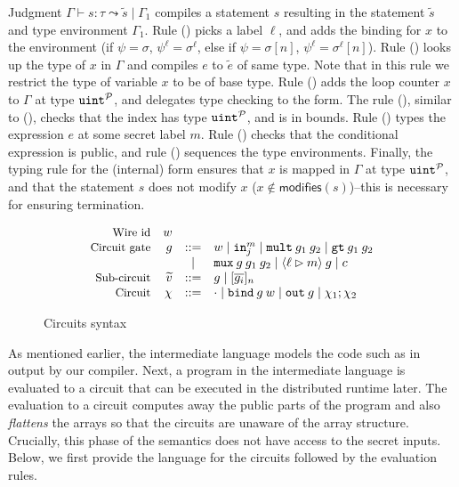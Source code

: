 Judgment $\Gamma \vdash s : \tau \leadsto \widetilde{s} \mid \Gamma_{1}$
compiles a statement $s$ resulting in the statement $\widetilde{s}$
and type environment $\Gamma_{1}$. Rule ({}) picks a label
$\ell$, and adds the binding for $x$ to the environment (if $\psi =
\sigma$, $\psi^\ell = \sigma^\ell$, else if $\psi = \sigma[n]$,
$\psi^\ell = \sigma^\ell[n]$).
Rule ({}) looks up the type of $x$ in $\Gamma$ and compiles $e$ to $\tilde{e}$ of same type.
Note that in this rule we restrict the type of variable $x$ to be of base type.
Rule ({}) adds the loop counter $x$ to $\Gamma$ at type
${\mathtt{uint}}^{\mathcal{P}}$, and delegates type checking to the
 form. The rule ({}), similar to ({}),
checks that the index has type ${\mathtt{uint}}^{\mathcal{P}}$, and is in
bounds. Rule ({})
types the expression $e$ at some secret label $m$. Rule ({})
checks that the conditional expression is public, and rule
({}) sequences the type environments. Finally, the typing
rule for the (internal)  form ensures that $x$ is mapped in
$\Gamma$ at type ${\mathtt{uint}}^{\mathcal{P}}$, and that the statement $s$
does not modify $x$ ($x \notin
\mathsf{modifies}(s)$)--this is necessary for ensuring termination.


\begin{figure}
  \footnotesize
  \[
  \begin{array}{rrcl}
    \text{\small{Wire id}} & w &&\\
    \text{\small{Circuit gate}} & {g} & ::= & w \mid {\ensuremath{\mathtt{in}}}^{m}_{j} \mid {\ensuremath{\mathtt{mult}}}\:{g}_1\:{g}_{2} \mid {\ensuremath{\mathtt{gt}}}\:{g}_{1}\:{g}_{2}\\
    & & \mid & {\mathtt{mux}}\:{g}\:{g}_{1}\:{g}_{2} \mid \langle \ell
    \rhd m \rangle\:{g} \mid c\\
    \text{\small{Sub-circuit}} & \widetilde{v} & ::= & {g} \mid [\overline{{g}_{i}}]_{n}\\
    \text{\small{Circuit}} & \chi & ::= & \cdot \mid {\ensuremath{\mathtt{bind}}}\:{g}\:w \mid {\ensuremath{\mathtt{out}}}\:{g} \mid \chi_{1}; \chi_{2}
  \end{array}
  \]
\caption{Circuits  syntax}
\label{fig:circuits}
\end{figure}

As mentioned earlier, the intermediate language models the code such
as in  output by our compiler.
Next, a program in the intermediate language is evaluated to a circuit
that can be executed in the distributed runtime later. The evaluation
to a circuit computes away the public parts of the program and also
\emph{flattens} the arrays so that the circuits are unaware of the
array structure.
Crucially, this phase of the semantics does not have access to the
secret inputs.
Below, we first provide the language for the circuits followed by the
evaluation rules.

